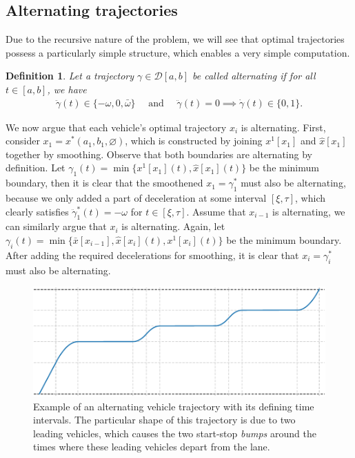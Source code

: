 \documentclass[a4paper]{article}
\theoremstyle{definition}
\theoremstyle{plain}
\newtheorem{define}{Definition\hspace{0.25em}\ignorespaces}
\begin{document}
\subsection{Alternating trajectories}

Due to the recursive nature of the problem, we will see that optimal
trajectories possess a particularly simple structure, which enables a very
simple computation.

\begin{define}
  Let a trajectory $\gamma \in \mathcal{D}[a, b]$ be called \emph{alternating} if for all
  $t \in [a, b]$, we have
  \begin{align}
    \ddot{\gamma}(t) \in \{-\omega, 0, \bar{\omega}\} \quad \text{ and } \quad
    \ddot{\gamma}(t) = 0 \implies \dot{\gamma}(t) \in \{0, 1\}.
  \end{align}
\end{define}

We now argue that each vehicle's optimal trajectory $x_{i}$ is alternating.
First, consider $x_{1} = x^{*}(a_{1}, b_{1}, \varnothing)$, which is
constructed by joining $x^{1}[x_{1}]$ and $\hat{x}[x_{1}]$ together by smoothing. Observe that both boundaries are alternating by definition. Let
$\gamma_{1}(t) = \min\{x^{1}[x_{1}](t), \hat{x}[x_{1}](t) \}$ be the minimum boundary,
then it is clear that the smoothened $x_{1} = \gamma_{1}^{*}$ must also be
alternating, because we only added a part of deceleration at some interval
$[\xi, \tau]$, which clearly satisfies $\ddot{\gamma}_{1}^{*}(t) = -\omega$ for
$t \in [\xi,\tau]$.
%
Assume that $x_{i-1}$ is alternating, we can similarly argue that $x_{i}$ is
alternating. Again, let
$\gamma_{i}(t) = \min\{\bar{x}[x_{i-1}], \hat{x}[x_{i}](t), x^{1}[x_{i}](t)\}$ be the
minimum boundary. After adding the required decelerations for smoothing, it is
clear that $x_{i} = \gamma^{*}_{i}$ must also be alternating.

\begin{figure}
  \centering
  \includegraphics[scale=0.9]{figures/motion/tandem_trajectory}
  \caption{Example of an alternating vehicle trajectory with its defining time
    intervals. The particular shape of this trajectory is due to two leading
    vehicles, which causes the two start-stop \emph{bumps} around the times where these
    leading vehicles depart from the lane.}
  \label{fig:tandem_trajectory}
\end{figure}
\end{document}
